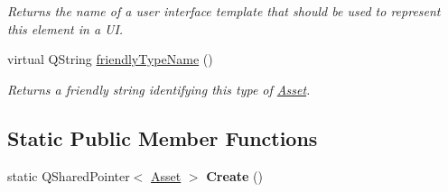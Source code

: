 \begin{DoxyCompactItemize}
\begin{DoxyCompactList}\small\item\em Returns the name of a user interface template that should be used to represent this element in a U\-I. \end{DoxyCompactList}\item 
virtual Q\-String \hyperlink{class_picto_1_1_analysis_period_ae5e82cde88b37db31663861e9f0d9ad3}{friendly\-Type\-Name} ()
\begin{DoxyCompactList}\small\item\em Returns a friendly string identifying this type of \hyperlink{class_picto_1_1_asset}{Asset}. \end{DoxyCompactList}\end{DoxyCompactItemize}
\subsection*{Static Public Member Functions}
\begin{DoxyCompactItemize}
\item 
\hypertarget{class_picto_1_1_analysis_period_a01f8844e6da32e019aa5f66a079c1dae}{static Q\-Shared\-Pointer$<$ \hyperlink{class_picto_1_1_asset}{Asset} $>$ {\bfseries Create} ()}\label{class_picto_1_1_analysis_period_a01f8844e6da32e019aa5f66a079c1dae}

\end{DoxyCompactItemize}
